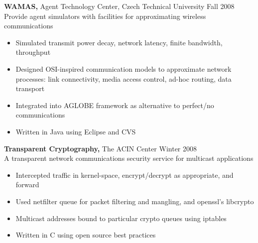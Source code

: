 \documentclass[margin]{res}
\begin{document}
\begin{resume}
{\bf WAMAS,} Agent Technology Center, Czech Technical University \hfill Fall 2008 \\
Provide agent simulators with facilities for approximating wireless communications
\begin{itemize} \itemsep -2pt %
\item Simulated transmit power decay, network latency, finite bandwidth, throughput
\item Designed OSI-inspired communication models to approximate network processes: link connectivity, media access control, ad-hoc routing, data transport
\item Integrated into AGLOBE framework as alternative to perfect/no communications
\item Written in Java using Eclipse and CVS
\end{itemize}

{\bf Transparent Cryptography,} The ACIN Center \hfill Winter 2008 \\
A transparent network communications security service for multicast applications
\begin{itemize} \itemsep -2pt %
\item Intercepted traffic in kernel-space, encrypt/decrypt as appropriate, and forward
\item Used netfilter queue for packet filtering and mangling, and openssl's libcrypto
\item Multicast addresses bound to particular crypto queues using iptables
\item Written in C using open source best practices%
\end{itemize}



\end{resume}
\end{document}

